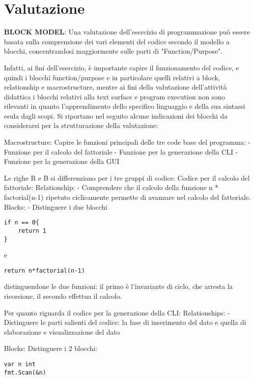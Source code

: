 \section{Valutazione}
\textbf{BLOCK MODEL}:
Una valutazione dell'esercizio di programmazione può essere basata sulla comprensione dei vari elementi del codice secondo il modello a blocchi, concentrandosi maggiormente sulle parti di "Function/Purpose".

Infatti, ai fini dell'esercizio, è importante capire il funzionamento del codice, e quindi i blocchi function/purpose e in particolare quelli relativi a block, relationship e macrostructure, mentre ai fini della valutazione dell'attività didattica i blocchi relativi alla text surface e program execution non sono rilevanti in quanto l'apprendimento dello specifico linguaggio e della sua sintassi esula dagli scopi.
Si riportano nel seguito alcune indicazioni dei blocchi da considerarsi per la strutturazione della valutazione:

Macrostructure:
Capire le funzioni principali delle tre code base del programma:
- Funzione per il calcolo del fattoriale
- Funzione per la generazione della CLI
- Funzione per la generazione della GUI

Le righe R e B si differenziano per i tre gruppi di codice:
Codice per il calcolo del fattoriale:
Relationship:
- Comprendere che il calcolo della funzione n * factorial(n-1) ripetuto ciclicamente permette di avanzare nel calcolo del fattoriale.
Blocks:
- Distinguere i due blocchi

\begin{verbatim}
if n == 0{
    return 1
}
\end{verbatim}

e

\begin{verbatim}
return n*factorial(n-1)
\end{verbatim}

distinguendone le due funzioni: il primo è l'invariante di ciclo, che arresta la ricorsione, il secondo effettua il calcolo.

Per quanto riguarda il codice per la generazione della CLI:
Relationships:
- Distinguere le parti salienti del codice: la fase di inserimento del dato e quella di elaborazione e visualizzazione del dato

Blocks:
Distinguere i 2 blocchi:

\begin{verbatim}
var n int
fmt.Scan(&n)
\end{verbatim}

